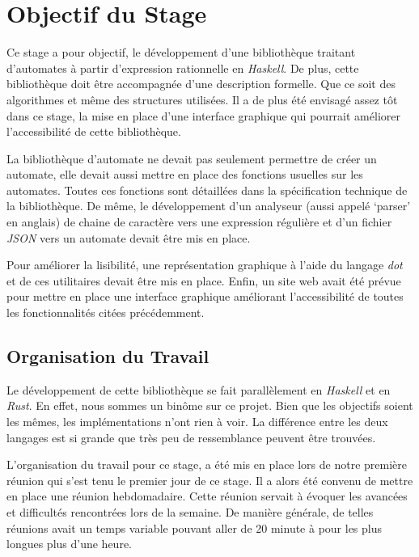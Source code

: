 \section{Objectif du Stage}

Ce stage a pour objectif, le développement d'une bibliothèque traitant 
d'automates à partir d'expression rationnelle en \textit{Haskell}. De plus, 
cette bibliothèque doit être accompagnée d'une description formelle. Que ce soit 
des algorithmes et même des structures utilisées. Il a de plus été envisagé 
assez tôt dans ce stage, la mise en place d'une interface graphique qui pourrait 
améliorer l'accessibilité de cette bibliothèque.

\vphantom{}

La bibliothèque d'automate ne devait pas seulement permettre de créer un 
automate, elle devait aussi mettre en place des fonctions usuelles sur les 
automates. Toutes ces fonctions sont détaillées dans la spécification technique 
de la bibliothèque. De même, le développement d'un analyseur (aussi appelé 
`parser' en anglais) de chaine de caractère vers une expression régulière et 
d'un fichier \textit{JSON} vers un automate devait être mis en place.

\vphantom{}

Pour améliorer la lisibilité, une représentation graphique à l'aide du langage 
\textit{dot} et de ces utilitaires devait être mis en place. Enfin, un site 
web avait été prévue pour mettre en place une interface graphique améliorant 
l'accessibilité de toutes les fonctionnalités citées précédemment. 

\subsection{Organisation du Travail}

Le développement de cette bibliothèque se fait parallèlement en \textit{Haskell}
et en \textit{Rust}. En effet, nous sommes un binôme sur ce projet. Bien que les 
objectifs soient les mêmes, les implémentations n'ont rien à voir. La différence
entre les deux langages est si grande que très peu de ressemblance peuvent être 
trouvées.

\vphantom{}

L'organisation du travail pour ce stage, a été mis en place lors de notre 
première réunion qui s'est tenu le premier jour de ce stage. Il a alors été 
convenu de mettre en place une réunion hebdomadaire. Cette réunion servait à 
évoquer les avancées et difficultés rencontrées lors de la semaine. De manière 
générale, de telles réunions avait un temps variable pouvant aller de 20 minute 
à pour les plus longues plus d'une heure.

